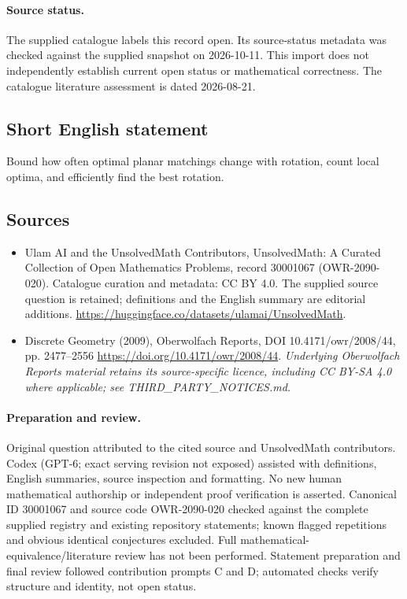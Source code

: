 \documentclass[11pt]{article}
\begin{document}
\paragraph{Source status.}
The supplied catalogue labels this record open. Its source-status metadata was checked against the supplied snapshot on 2026-10-11. This import does not independently establish current open status or mathematical correctness. The catalogue literature assessment is dated 2026-08-21.
\subsection{Short English statement}
Bound how often optimal planar matchings change with rotation, count local optima, and efficiently find the best rotation.
\subsection{Sources}
\begin{itemize}
\item[\hypertarget{source:30001067:1}{S1}] Ulam AI and the UnsolvedMath Contributors, UnsolvedMath: A Curated Collection of Open Mathematics Problems, record 30001067 (OWR-2090-020). Catalogue curation and metadata: CC BY 4.0. The supplied source question is retained; definitions and the English summary are editorial additions.
\url{https://huggingface.co/datasets/ulamai/UnsolvedMath}.
\item[\hypertarget{source:30001067:2}{S2}] Discrete Geometry (2009), Oberwolfach Reports, DOI 10.4171/owr/2008/44, pp. 2477--2556
\url{https://doi.org/10.4171/owr/2008/44}.
\textit{Underlying Oberwolfach Reports material retains its source-specific licence, including CC BY-SA 4.0 where applicable; see THIRD\_PARTY\_NOTICES.md.}
\end{itemize}
\paragraph{Preparation and review.}
Original question attributed to the cited source and UnsolvedMath contributors. Codex (GPT-6; exact serving revision not exposed) assisted with definitions, English summaries, source inspection and formatting. No new human mathematical authorship or independent proof verification is asserted. Canonical ID 30001067 and source code OWR-2090-020 checked against the complete supplied registry and existing repository statements; known flagged repetitions and obvious identical conjectures excluded. Full mathematical-equivalence/literature review has not been performed. Statement preparation and final review followed contribution prompts C and D; automated checks verify structure and identity, not open status.
\label{end:30001067}
\end{document}
